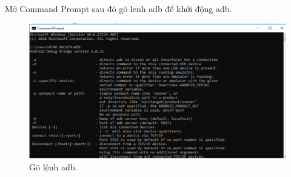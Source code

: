  Mở Command Prompt sau đó gõ lenh adb để khởi động adb.
\newpage
\begin{center}
    \begin{figure}[htp]
    \begin{center}
     \includegraphics[scale=0.5]{image3/ADB}
    \end{center}
    \caption{Gõ lệnh adb.}
    \label{refhinh1}
    \end{figure}
\end{center}

